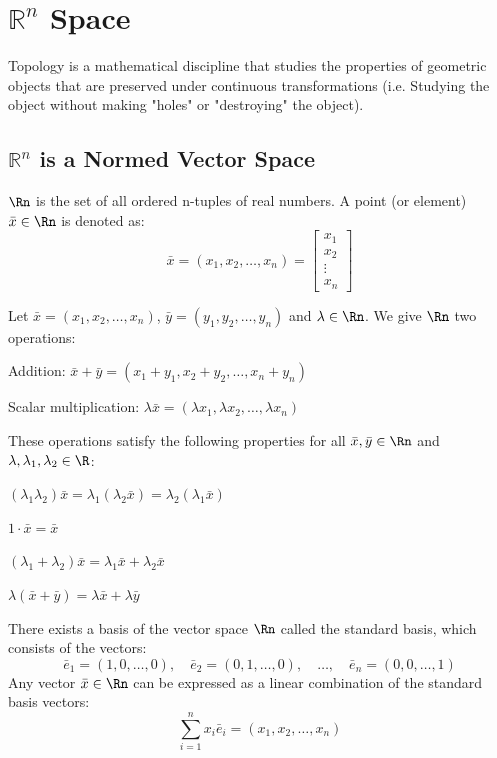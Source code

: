 \chapter{$\mathbb{R}^n$ Space}
Topology is a mathematical discipline that studies the properties of geometric objects that are preserved under continuous transformations (i.e. Studying the object without making "holes" or "destroying" the object). 

\section{$\mathbb{R}^n$ is a Normed Vector Space}
\begin{definition}
    $\Rn$ is the set of all ordered n-tuples of real numbers. A point (or element) $\bar{x} \in \Rn$ is denoted as:
    \[
        \bar{x} = (x_1, x_2, \ldots, x_n) = \begin{bmatrix}
            x_1 \\
            x_2 \\
            \vdots \\
            x_n
        \end{bmatrix}
    \]
\end{definition}
Let $\bar{x} = (x_1, x_2, \ldots, x_n)$, $\bar{y} = (y_1, y_2, \ldots, y_n)$ and $\lambda \in \Rn$. We give $\Rn$ two operations:
\begin{citemize}
    \item Addition: $\bar{x} + \bar{y} = (x_1 + y_1, x_2 + y_2, \ldots, x_n + y_n)$
    \item Scalar multiplication: $\lambda \bar{x} = (\lambda x_1, \lambda x_2, \ldots, \lambda x_n)$
\end{citemize}
These operations satisfy the following properties for all $\bar{x}, \bar{y} \in \Rn$ and $\lambda, \lambda_1, \lambda_2 \in \R$:
\begin{citemize}
    \item $(\lambda_1 \lambda_2) \bar{x} = \lambda_1(\lambda_2 \bar{x}) = \lambda_2 (\lambda_1 \bar{x})$
    \item $1 \cdot \bar{x} = \bar{x}$
    \item $(\lambda_1 + \lambda_2) \bar{x} = \lambda_1 \bar{x} + \lambda_2 \bar{x}$
    \item $\lambda (\bar{x} + \bar{y}) = \lambda \bar{x} + \lambda \bar{y}$
\end{citemize}
There exists a basis of the vector space $\Rn$ called the standard basis, which consists of the vectors:
\[
    \bar{e}_1 = (1, 0, \ldots, 0), \quad \bar{e}_2 = (0, 1, \ldots, 0), \quad \ldots, \quad \bar{e}_n = (0, 0, \ldots, 1)
\]
Any vector $\bar{x} \in \Rn$ can be expressed as a linear combination of the standard basis vectors:
\[
    \sum_{i=1}^n x_i \bar{e}_i = (x_1, x_2, \ldots, x_n)
\]

